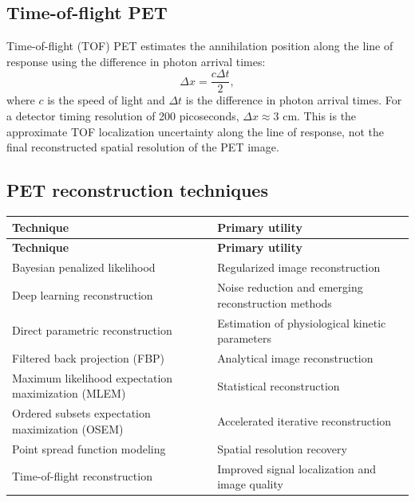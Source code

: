\subsection{Time-of-flight PET}
Time-of-flight (TOF) PET estimates the annihilation position along the line of response using the difference in photon arrival times:
\begin{equation}
\Delta x=\frac{c\Delta t}{2},
\end{equation}
where $c$ is the speed of light and $\Delta t$ is the difference in photon arrival times. For a detector timing resolution of 200 picoseconds, $\Delta x\approx3$ cm. This is the approximate TOF localization uncertainty along the line of response, not the final reconstructed spatial resolution of the PET image.

\subsection{PET reconstruction techniques}
\begin{longtable}{@{}p{}p{}@{}}
\toprule
\textbf{Technique} & \textbf{Primary utility} \\
\midrule
\endfirsthead
\toprule
\textbf{Technique} & \textbf{Primary utility} \\
\midrule
\endhead
Bayesian penalized likelihood & Regularized image reconstruction \\
Deep learning reconstruction & Noise reduction and emerging reconstruction methods \\
Direct parametric reconstruction & Estimation of physiological kinetic parameters \\
Filtered back projection (FBP) & Analytical image reconstruction \\
Maximum likelihood expectation maximization (MLEM) & Statistical reconstruction \\
Ordered subsets expectation maximization (OSEM) & Accelerated iterative reconstruction \\
Point spread function modeling & Spatial resolution recovery \\
Time-of-flight reconstruction & Improved signal localization and image quality \\
\bottomrule
\end{longtable}

